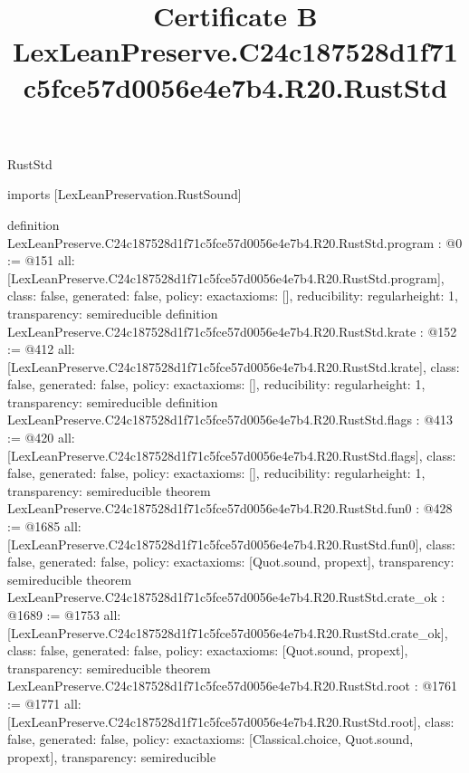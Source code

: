 \begin{lexlean}{RustStd}
\title{Certificate B LexLeanPreserve.C24c187528d1f71c5fce57d0056e4e7b4.R20.RustStd}
\begin{coremodule}
imports [LexLeanPreservation.RustSound]

definition LexLeanPreserve.C24c187528d1f71c5fce57d0056e4e7b4.R20.RustStd.program : @0 := @151 {
  all: [LexLeanPreserve.C24c187528d1f71c5fce57d0056e4e7b4.R20.RustStd.program],
  class: false,
  generated: false,
  policy: exact{axioms: []},
  reducibility: regular{height: 1},
  transparency: semireducible
}
definition LexLeanPreserve.C24c187528d1f71c5fce57d0056e4e7b4.R20.RustStd.krate : @152 := @412 {
  all: [LexLeanPreserve.C24c187528d1f71c5fce57d0056e4e7b4.R20.RustStd.krate],
  class: false,
  generated: false,
  policy: exact{axioms: []},
  reducibility: regular{height: 1},
  transparency: semireducible
}
definition LexLeanPreserve.C24c187528d1f71c5fce57d0056e4e7b4.R20.RustStd.flags : @413 := @420 {
  all: [LexLeanPreserve.C24c187528d1f71c5fce57d0056e4e7b4.R20.RustStd.flags],
  class: false,
  generated: false,
  policy: exact{axioms: []},
  reducibility: regular{height: 1},
  transparency: semireducible
}
theorem LexLeanPreserve.C24c187528d1f71c5fce57d0056e4e7b4.R20.RustStd.fun0 : @428 := @1685 {
  all: [LexLeanPreserve.C24c187528d1f71c5fce57d0056e4e7b4.R20.RustStd.fun0],
  class: false,
  generated: false,
  policy: exact{axioms: [Quot.sound, propext]},
  transparency: semireducible
}
theorem LexLeanPreserve.C24c187528d1f71c5fce57d0056e4e7b4.R20.RustStd.crate_ok : @1689 := @1753 {
  all: [LexLeanPreserve.C24c187528d1f71c5fce57d0056e4e7b4.R20.RustStd.crate_ok],
  class: false,
  generated: false,
  policy: exact{axioms: [Quot.sound, propext]},
  transparency: semireducible
}
theorem LexLeanPreserve.C24c187528d1f71c5fce57d0056e4e7b4.R20.RustStd.root : @1761 := @1771 {
  all: [LexLeanPreserve.C24c187528d1f71c5fce57d0056e4e7b4.R20.RustStd.root],
  class: false,
  generated: false,
  policy: exact{axioms: [Classical.choice, Quot.sound, propext]},
  transparency: semireducible
}


\end{coremodule}
\end{lexlean}
